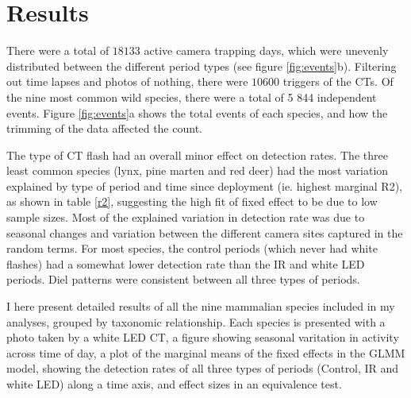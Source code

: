\chapter{Results}



There were a total of $18 133$ active camera trapping days, which were unevenly distributed between the different period types (see figure \ref{fig:events}b). Filtering out time lapses and photos of nothing, there were $10 600$ triggers of the CTs. 
Of the nine most common wild species, there were a total of 5 844 independent events. Figure \ref{fig:events}a shows the total events of each species, and how the trimming of the data affected the count.

The type of CT flash had an overall minor effect on detection rates. 
The three least common species (lynx, pine marten and red deer) had the most variation explained by type of period and time since deployment (ie. highest marginal R2), as shown in table \ref{r2}, suggesting the high fit of fixed effect to be due to low sample sizes.
Most of the explained variation in detection rate was due to seasonal changes and variation between the different camera sites captured in the random terms. %
For most species, the control periods (which never had white flashes) had a somewhat lower detection rate than the IR and white LED periods.
Diel patterns were consistent between all three types of periods.



I here present detailed results of all the nine mammalian species included in my analyses, grouped by taxonomic relationship.
Each species is presented with a photo taken by a white LED CT, 
a figure showing seasonal varitation in activity across time of day, 
a plot of the marginal means of the fixed effects in the GLMM model, showing the detection rates of all three types of periods (Control, IR and white LED) along a time axis,
and effect sizes in an equivalence test.


